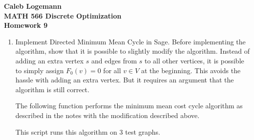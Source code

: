\documentclass[11pt, oneside]{article}
\begin{document}
\noindent \textbf{\Large{Caleb Logemann \\
MATH 566 Discrete Optimization\\
Homework 9
}}

%
\begin{enumerate}
  \item %
    Implement Directed Minimum Mean Cycle in Sage. 
    Before implementing the algorithm, show that it is possible to slightly
    modify the algorithm.
    Instead of adding an extra vertex $s$ and edges from $s$ to all other
    vertices, it is possible to simply assign $F_0(v) = 0$ for all $v \in V$ at
    the beginning.
    This avoids the hassle with adding an extra vertex.
    But it requires an argument that the algorithm is still correct.


    The following function performs the minimum mean cost cycle algorithm
    as described in the notes with the modification described above.
    
    This script runs this algorithm on 3 test graphs.
    


\end{enumerate}
\end{document}
